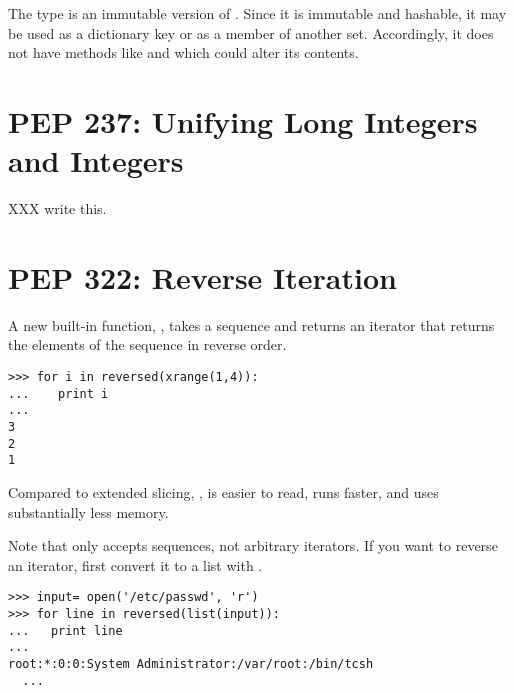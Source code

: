 \documentclass{howto}
\begin{document}
The type  is an immutable version of .
Since it is immutable and hashable, it may be used as a dictionary key or
as a member of another set.  Accordingly, it does not have methods
like  and  which could alter its contents.


\begin{seealso}
\end{seealso}

\section{PEP 237: Unifying Long Integers and Integers}

XXX write this.

\section{PEP 322: Reverse Iteration}

A new built-in function, , takes a sequence
and returns an iterator that returns the elements of the sequence 
in reverse order.  

\begin{verbatim}
>>> for i in reversed(xrange(1,4)):
...    print i
... 
3
2
1
\end{verbatim}

Compared to extended slicing, , 
is easier to read, runs faster, and uses substantially less memory.

Note that  only accepts sequences, not arbitrary
iterators.  If you want to reverse an iterator, first convert it to 
a list with .

\begin{verbatim}
>>> input= open('/etc/passwd', 'r')
>>> for line in reversed(list(input)):
...   print line
... 
root:*:0:0:System Administrator:/var/root:/bin/tcsh
  ...
\end{verbatim}
\end{document}
